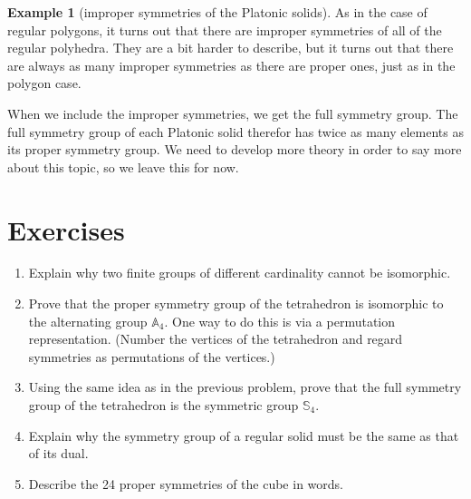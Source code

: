 \documentclass[11pt]{article}
\newenvironment{problems}
{\begin{enumerate}[topsep=1pt,itemsep=0pt,parsep=2pt,leftmargin=0.6cm,%
 label={\arabic*.}, ref=\arabic*]\small%
}
{
 \end{enumerate}
}
\theoremstyle{definition}
\newtheorem{example}[thm]{Example}
\newcommand{\Sym}{\mathbb{S}}
\newcommand{\Alt}{\mathbb{A}}
\begin{document}
\begin{example}[improper symmetries of the Platonic solids]
%
As in the case of regular polygons, it turns out that there are
improper symmetries of all of the regular polyhedra. They are a bit
harder to describe, but it turns out that there are always as many
improper symmetries as there are proper ones, just as in the polygon
case.

When we include the improper symmetries, we get the full symmetry
group. The full symmetry group of each Platonic solid therefor has
twice as many elements as its proper symmetry group. We need to
develop more theory in order to say more about this topic, so we leave
this for now.
\end{example}





\section*{Exercises}
\begin{problems}

\item Explain why two finite groups of different cardinality cannot
  be isomorphic.

\item Prove that the proper symmetry group of the tetrahedron is
  isomorphic to the alternating group $\Alt_4$. One way to do this is
  via a permutation representation. (Number the vertices of the
  tetrahedron and regard symmetries as permutations of the vertices.)

\item Using the same idea as in the previous problem, prove that the
  full symmetry group of the tetrahedron is the symmetric group
  $\Sym_4$.

\item Explain why the symmetry group of a regular solid must be the
  same as that of its dual.

\item Describe the 24 proper symmetries of the cube in words. 

\end{problems}
\end{document}
